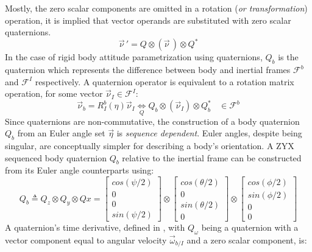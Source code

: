 Mostly, the zero scalar components are omitted in a rotation (\emph{or transformation}) operation, it is implied that vector operands are substituted with zero scalar quaternions.
\begin{equation}\label{eq:quaternion-rotation}
\vec{\nu}\hspace{2pt}'=Q \otimes (\vec{\nu}\hspace{2pt}) \otimes Q^*
\end{equation} 
In the case of rigid body attitude parametrization using quaternions, $Q_b$ is the quaternion which represents the difference between body and inertial frames $\mathcal{F}^b$ and $\mathcal{F}^I$ respectively. A quaternion operator is equivalent to a rotation matrix operation, for some vector $\vec{\nu}_I\in\mathcal{F}^I$:
\begin{equation}
\vec{\nu}_b=R_I^b(\eta)\vec{\nu}_I \underset{Q}{\iff} Q_b \otimes (\vec{\nu}_I) \otimes Q_b^*~~~~\in\mathcal{F}^b
\end{equation}
Since quaternions are non-commutative, the construction of a body quaternion $Q_b$ from an Euler angle set $\vec{\eta}$ is \emph{sequence dependent}. Euler angles, despite being singular, are conceptually simpler for describing a body's orientation. A ZYX sequenced body quaternion $Q_b$ relative to the inertial frame can be constructed from its Euler angle counterparts using:
\begin{equation}\label{eq:quaternion-sequence}
Q_b\triangleq Q_z\otimes Q_y\otimes Qx=\begin{bmatrix}
cos(\psi/2)\\
0\\
0\\
sin(\psi/2)
\end{bmatrix}
\otimes
\begin{bmatrix}
cos(\theta/2)\\
0\\
sin(\theta/2)\\
0
\end{bmatrix}
\otimes
\begin{bmatrix}
cos(\phi/2)\\
sin(\phi/2)\\
0\\
0
\end{bmatrix}
\end{equation}
A quaternion's time derivative, defined in \cite{fullquaternion}, with $Q_\omega$ being a quaternion with a vector component equal to angular velocity $\vec{\omega}_{b/I}$ and a zero scalar component, is:
